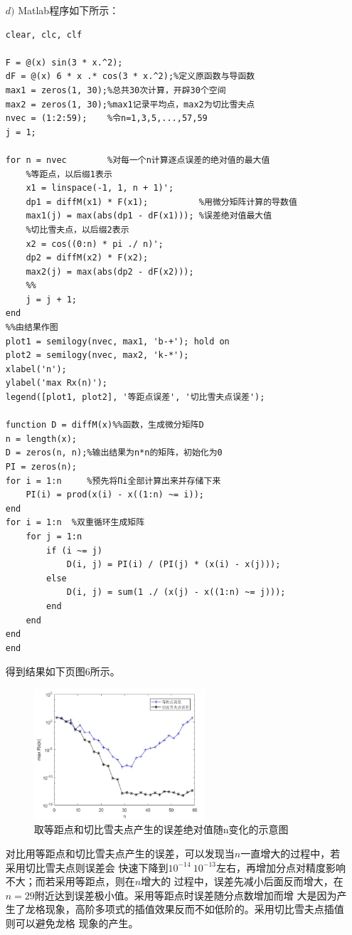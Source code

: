\documentclass[12pt,a4paper,utf8]{ctexart}
\begin{document}
\begin{enumerate}
\begin{enumerate}
        
    \item[$d)$] Matlab程序如下所示：
  \begin{lstlisting}[frame=single]
clear, clc, clf

F = @(x) sin(3 * x.^2);
dF = @(x) 6 * x .* cos(3 * x.^2);%定义原函数与导函数
max1 = zeros(1, 30);%总共30次计算，开辟30个空间
max2 = zeros(1, 30);%max1记录平均点，max2为切比雪夫点
nvec = (1:2:59);    %令n=1,3,5,...,57,59
j = 1;

for n = nvec        %对每一个n计算逐点误差的绝对值的最大值
    %等距点，以后缀1表示
    x1 = linspace(-1, 1, n + 1)';
    dp1 = diffM(x1) * F(x1);          %用微分矩阵计算的导数值
    max1(j) = max(abs(dp1 - dF(x1))); %误差绝对值最大值
    %切比雪夫点，以后缀2表示
    x2 = cos((0:n) * pi ./ n)';
    dp2 = diffM(x2) * F(x2);
    max2(j) = max(abs(dp2 - dF(x2)));
    %%
    j = j + 1;
end
%%由结果作图
plot1 = semilogy(nvec, max1, 'b-+'); hold on
plot2 = semilogy(nvec, max2, 'k-*');
xlabel('n');
ylabel('max Rx(n)');
legend([plot1, plot2], '等距点误差', '切比雪夫点误差');

function D = diffM(x)%%函数，生成微分矩阵D
n = length(x);
D = zeros(n, n);%输出结果为n*n的矩阵，初始化为0
PI = zeros(n); 
for i = 1:n     %预先将Πi全部计算出来并存储下来
    PI(i) = prod(x(i) - x((1:n) ~= i));
end
for i = 1:n  %双重循环生成矩阵
    for j = 1:n
        if (i ~= j)
            D(i, j) = PI(i) / (PI(j) * (x(i) - x(j)));
        else
            D(i, j) = sum(1 ./ (x(j) - x((1:n) ~= j)));
        end
    end
end
end
  \end{lstlisting}
        得到结果如下页图6所示。\\
        \begin{figure}[h]
            \centering
            \includegraphics[width=0.6\textwidth]{T2D.JPG}
            \caption{取等距点和切比雪夫点产生的误差绝对值随n变化的示意图}
        \end{figure}
        \quad \quad 对比用等距点和切比雪夫点产生的误差，可以发现当$n$一直增大的过程中，若采用切比雪夫点则误差会
        快速下降到$10^{-14}~10^{-13}$左右，再增加分点对精度影响不大；而若采用等距点，则在$n$增大的
        过程中，误差先减小后面反而增大，在$n=29$附近达到误差极小值。采用等距点时误差随分点数增加而增
        大是因为产生了龙格现象，高阶多项式的插值效果反而不如低阶的。采用切比雪夫点插值则可以避免龙格
        现象的产生。
        \\
        \\
        \\


\end{enumerate}
\end{enumerate}
\end{document}
